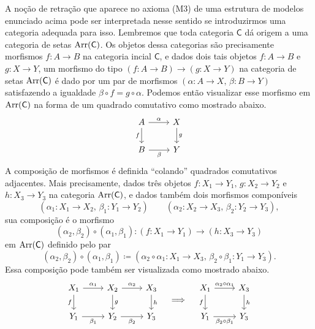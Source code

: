 \begin{obs}
  A noção de retração que aparece no axioma (M3) de uma estrutura de modelos enunciado acima pode ser interpretada nesse sentido se introduzirmos uma categoria adequada para isso.
  Lembremos que toda categoria $\mathsf{C}$ dá origem a uma categoria de setas $\mathrm{Arr}(\mathsf{C})$.
  Os objetos dessa categorias são precisamente morfismos $f: A \to B$ na categoria incial $\mathsf{C}$, e dados dois tais objetos $f: A \to B$ e $g: X \to Y$, um morfismo do tipo $(f: A \to B) \to (g: X \to Y)$ na categoria de setas $\mathrm{Arr}(\mathsf{C})$ é dado por um par de morfismos $(\alpha: A \to X,\, \beta: B \to Y)$ satisfazendo a igualdade $\beta \circ f = g \circ \alpha$.
  Podemos então visualizar esse morfismo em $\mathrm{Arr}(\mathsf{C})$ na forma de um quadrado comutativo como mostrado abaixo.
  \begin{displaymath}
    \begin{tikzcd}
      A
      \arrow[d, "f" swap]
      \arrow[r, "\alpha"]
      & X
      \arrow[d, "g"]
      \\ B
      \arrow[r, "\beta" swap]
      & Y
    \end{tikzcd}
  \end{displaymath}
  A composição de morfismos é definida ``colando'' quadrados comutativos adjacentes.
  Mais precisamente, dados três objetos $f: X_{1} \to Y_{1},\, g: X_{2} \to Y_{2}$ e $h: X_{3} \to Y_{3}$ na categoria $\mathrm{Arr}(\mathsf{C})$, e dados também dois morfismos componíveis
  \begin{displaymath}
    (\alpha_{1}: X_{1} \to X_{2},\, \beta_{1}: Y_{1} \to Y_{2}) \qquad (\alpha_{2}: X_{2} \to X_{3},\, \beta_{2}: Y_{2} \to Y_{3}),
  \end{displaymath}
  sua composição é o morfismo
  \begin{displaymath}
    (\alpha_{2}, \beta_{2}) \circ (\alpha_{1},\beta_{1}): (f: X_{1} \to Y_{1}) \to (h: X_{3} \to Y_{3})
  \end{displaymath}
  em $\mathrm{Arr}(\mathsf{C})$ definido pelo par
  \begin{displaymath}
    (\alpha_{2},\beta_{2}) \circ (\alpha_{1},\beta_{1}) \coloneqq (\alpha_{2} \circ \alpha_{1}: X_{1} \to X_{3},\, \beta_{2} \circ \beta_{1}: Y_{1} \to Y_{3}).
  \end{displaymath}
  Essa composição pode também ser visualizada como mostrado abaixo.
  \begin{displaymath}
    \begin{tikzcd}
      X_{1}
      \arrow[d, "f" swap]
      \arrow[r, "\alpha_{1}"]
      & X_{2}
      \arrow[d, "g"]
      \arrow[r, "\alpha_{2}"]
      & X_{3}
      \arrow[d, "h"]
      \\ Y_{1}
      \arrow[r, "\beta_{1}" swap]
      & Y_{2}
      \arrow[r, "\beta_{2}" swap]
      & Y_{3}
    \end{tikzcd}
    \quad \Longrightarrow \quad
    \begin{tikzcd}
      X_{1}
      \arrow[d, "f" swap]
      \arrow[r, "\alpha_{2} \circ \alpha_{1}"]
      & X_{3}
      \arrow[d, "h"]
      \\ Y_{1}
      \arrow[r, "\beta_{2} \circ \beta_{1}" swap]
      & Y_{3}
    \end{tikzcd}
  \end{displaymath}


\end{obs}
